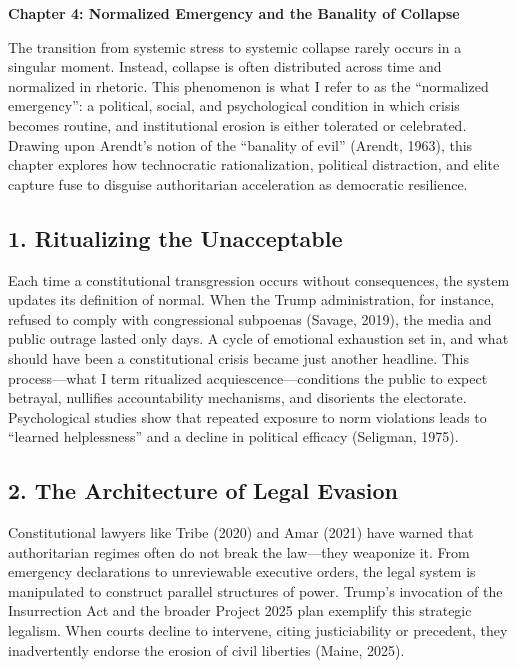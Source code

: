 \textbf{Chapter 4: Normalized Emergency and the Banality of Collapse}

The transition from systemic stress to systemic collapse rarely occurs
in a singular moment. Instead, collapse is often distributed across time
and normalized in rhetoric. This phenomenon is what I refer to as the
``normalized emergency'': a political, social, and psychological
condition in which crisis becomes routine, and institutional erosion is
either tolerated or celebrated. Drawing upon Arendt's notion of the
``banality of evil'' (Arendt, 1963), this chapter explores how
technocratic rationalization, political distraction, and elite capture
fuse to disguise authoritarian acceleration as democratic resilience.

\subsection{1. Ritualizing the
Unacceptable}\label{ritualizing-the-unacceptable}

Each time a constitutional transgression occurs without consequences,
the system updates its definition of normal. When the Trump
administration, for instance, refused to comply with congressional
subpoenas (Savage, 2019), the media and public outrage lasted only days.
A cycle of emotional exhaustion set in, and what should have been a
constitutional crisis became just another headline. This process---what
I term ritualized acquiescence---conditions the public to expect
betrayal, nullifies accountability mechanisms, and disorients the
electorate. Psychological studies show that repeated exposure to norm
violations leads to ``learned helplessness'' and a decline in political
efficacy (Seligman, 1975).

\subsection{2. The Architecture of Legal
Evasion}\label{the-architecture-of-legal-evasion}

Constitutional lawyers like Tribe (2020) and Amar (2021) have warned
that authoritarian regimes often do not break the law---they weaponize
it. From emergency declarations to unreviewable executive orders, the
legal system is manipulated to construct parallel structures of power.
Trump's invocation of the Insurrection Act and the broader Project 2025
plan exemplify this strategic legalism. When courts decline to
intervene, citing justiciability or precedent, they inadvertently
endorse the erosion of civil liberties (Maine, 2025).

